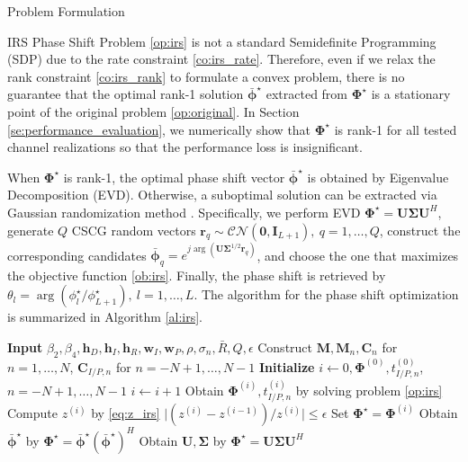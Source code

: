\documentclass{IEEEtran}
\begin{document}
\begin{section}{Problem Formulation}
\begin{subsection}{IRS Phase Shift}
		Problem \ref{op:irs} is not a standard Semidefinite Programming (SDP) due to the rate constraint \ref{co:irs_rate}. Therefore, even if we relax the rank constraint \ref{co:irs_rank} to formulate a convex problem, there is no guarantee that the optimal rank-1 solution $\bar{\boldsymbol{\phi}}^{\star}$ extracted from $\boldsymbol{\Phi}^{\star}$ is a stationary point of the original problem \ref{op:original}. In Section \ref{se:performance_evaluation}, we numerically show that $\boldsymbol{\Phi}^{\star}$ is rank-1 for all tested channel realizations so that the performance loss is insignificant.

		When $\boldsymbol{\Phi}^{\star}$ is rank-1, the optimal phase shift vector $\bar{\boldsymbol{\phi}}^\star$ is obtained by Eigenvalue Decomposition (EVD). Otherwise, a suboptimal solution can be extracted via Gaussian randomization method \cite{Huang2010}. Specifically, we perform EVD $\boldsymbol{\Phi}^{\star}=\boldsymbol{U}\boldsymbol{\Sigma}\boldsymbol{U}^H$, generate $Q$ CSCG random vectors $\boldsymbol{r}_q \sim \mathcal{CN}(\boldsymbol{0},\boldsymbol{I}_{L+1}),\ q=1,\dots,Q$, construct the corresponding candidates $\bar{\boldsymbol{\phi}}_q=e^{j\arg\left(\boldsymbol{U}\boldsymbol{\Sigma}^{1/2}\boldsymbol{r}_q\right)}$, and choose the one that maximizes the objective function \ref{ob:irs}. Finally, the phase shift is retrieved by $\theta_l=\arg(\phi_l^\star/\phi_{L+1}^\star), \ l=1,\dots,L$. The algorithm for the phase shift optimization is summarized in Algorithm \ref{al:irs}.
		\begin{algorithm}
			\caption{SCA: IRS Phase Shift}
			\label{al:irs}
			\begin{algorithmic}[1]
				\State \textbf{Input} $\beta_2,\beta_4,\boldsymbol{h}_D,\boldsymbol{h}_I,\boldsymbol{h}_R,\boldsymbol{w}_I,\boldsymbol{w}_P,\rho,\sigma_n,\bar{R},Q,\epsilon$
				\State Construct $\boldsymbol{M},\boldsymbol{M}_n,\boldsymbol{C}_{n}$ for $n=1,\dots,N$, $\boldsymbol{C}_{I/P,n}$ for $n=-N+1,\dots,N-1$
				\State \textbf{Initialize} $i \gets 0,\boldsymbol{\Phi}^{(0)},t_{I/P,n}^{(0)}$, $n=-N+1,\dots,N-1$
				\Repeat
					\State $i \gets i + 1$
					\State Obtain $\boldsymbol{\Phi}^{(i)}, t_{I/P,n}^{(i)}$ by solving problem \ref{op:irs}
					\State Compute $z^{(i)}$ by \ref{eq:z_irs}
				\Until $\lvert (z^{(i)}-z^{(i-1)}) / z^{(i)} \rvert \le \epsilon$
				\State Set $\boldsymbol{\Phi}^{\star}=\boldsymbol{\Phi}^{(i)}$
					\State Obtain $\bar{\boldsymbol{\phi}}^\star$ by $\boldsymbol{\Phi}^{\star}=\bar{\boldsymbol{\phi}}^\star(\bar{\boldsymbol{\phi}}^\star)^H$
				\Else
					\State Obtain $\boldsymbol{U},\boldsymbol{\Sigma}$ by $\boldsymbol{\Phi}^{\star}=\boldsymbol{U}\boldsymbol{\Sigma}\boldsymbol{U}^H$


\end{algorithmic}
\end{algorithm}
\end{subsection}
\end{section}
\end{document}

